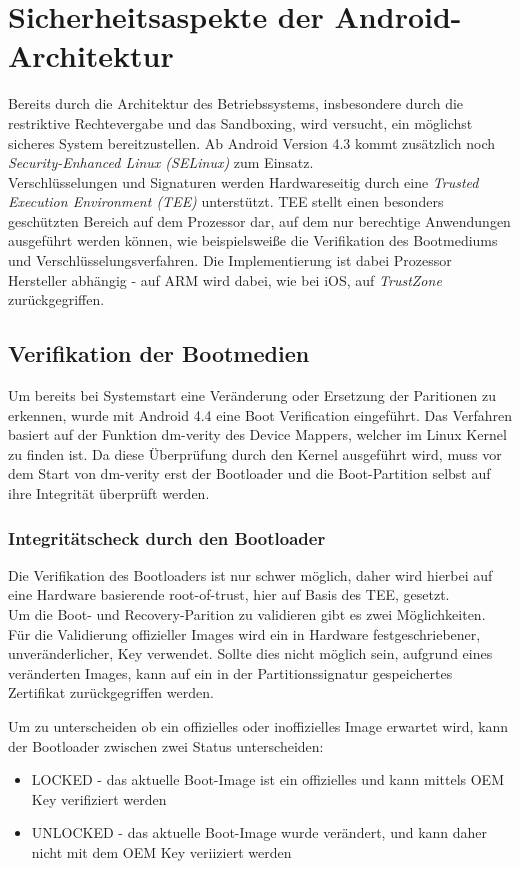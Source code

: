 \section{Sicherheitsaspekte der Android-Architektur}

	Bereits durch die Architektur des Betriebssystems, insbesondere durch die restriktive Rechtevergabe und das Sandboxing, wird versucht, ein möglichst sicheres System bereitzustellen. Ab Android Version 4.3 kommt zusätzlich noch \textit{Security-Enhanced Linux (SELinux)} zum Einsatz.\\
	Verschlüsselungen und Signaturen werden Hardwareseitig durch eine \textit{Trusted Execution Environment (TEE)} unterstützt. TEE stellt einen besonders geschützten Bereich auf dem Prozessor dar, auf dem nur berechtige Anwendungen ausgeführt werden können, wie beispielsweiße die Verifikation des Bootmediums und Verschlüsselungsverfahren. Die Implementierung ist dabei Prozessor Hersteller abhängig - auf ARM wird dabei, wie bei iOS, auf \textit{TrustZone}\cite{TEE_ARM} zurückgegriffen.
	
	\subsection{Verifikation der Bootmedien} \label{sec:VerifikationDerBootmedien}
	Um bereits bei Systemstart eine Veränderung oder Ersetzung der Paritionen zu erkennen, wurde mit Android 4.4 eine Boot Verification eingeführt. Das Verfahren basiert auf der Funktion dm-verity des Device Mappers, welcher im Linux Kernel zu finden ist. Da diese Überprüfung durch den Kernel ausgeführt wird, muss vor dem Start von dm-verity erst der Bootloader und die Boot-Partition selbst auf ihre Integrität überprüft werden.
	
	\subsubsection{Integritätscheck durch den Bootloader}
	Die Verifikation des Bootloaders ist nur schwer möglich, daher wird hierbei auf eine Hardware basierende root-of-trust, hier auf Basis des TEE, gesetzt. \\
	Um die Boot- und Recovery-Parition zu validieren gibt es zwei Möglichkeiten. Für die Validierung offizieller Images wird ein in Hardware festgeschriebener, unveränderlicher, Key verwendet. Sollte dies nicht möglich sein, aufgrund eines veränderten Images, kann auf ein in der Partitionssignatur gespeichertes Zertifikat zurückgegriffen werden.
\begin{flushleft}	
	Um zu unterscheiden ob ein offizielles oder inoffizielles Image erwartet wird, kann der Bootloader zwischen zwei Status unterscheiden:\\
\end{flushleft}
	\begin{itemize}\itemsep0pt
		\item LOCKED - das aktuelle Boot-Image ist ein offizielles und kann mittels OEM Key verifiziert werden
		\item UNLOCKED - das aktuelle Boot-Image wurde verändert, und kann daher nicht mit dem OEM Key veriiziert werden
	\end{itemize}
	
